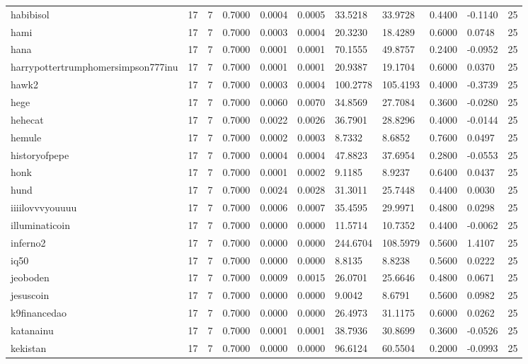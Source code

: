 \begin{table}[htbp]
\begin{tabular}{lllllllllll}
habibisol & 17 & 7 & 0.7000 & 0.0004 & 0.0005 & 33.5218 & 33.9728 & 0.4400 & -0.1140 & 25 \\
hami & 17 & 7 & 0.7000 & 0.0003 & 0.0004 & 20.3230 & 18.4289 & 0.6000 & 0.0748 & 25 \\
hana & 17 & 7 & 0.7000 & 0.0001 & 0.0001 & 70.1555 & 49.8757 & 0.2400 & -0.0952 & 25 \\
harrypottertrumphomersimpson777inu & 17 & 7 & 0.7000 & 0.0001 & 0.0001 & 20.9387 & 19.1704 & 0.6000 & 0.0370 & 25 \\
hawk2 & 17 & 7 & 0.7000 & 0.0003 & 0.0004 & 100.2778 & 105.4193 & 0.4000 & -0.3739 & 25 \\
hege & 17 & 7 & 0.7000 & 0.0060 & 0.0070 & 34.8569 & 27.7084 & 0.3600 & -0.0280 & 25 \\
hehecat & 17 & 7 & 0.7000 & 0.0022 & 0.0026 & 36.7901 & 28.8296 & 0.4000 & -0.0144 & 25 \\
hemule & 17 & 7 & 0.7000 & 0.0002 & 0.0003 & 8.7332 & 8.6852 & 0.7600 & 0.0497 & 25 \\
historyofpepe & 17 & 7 & 0.7000 & 0.0004 & 0.0004 & 47.8823 & 37.6954 & 0.2800 & -0.0553 & 25 \\
honk & 17 & 7 & 0.7000 & 0.0001 & 0.0002 & 9.1185 & 8.9237 & 0.6400 & 0.0437 & 25 \\
hund & 17 & 7 & 0.7000 & 0.0024 & 0.0028 & 31.3011 & 25.7448 & 0.4400 & 0.0030 & 25 \\
iiiilovvvyouuuu & 17 & 7 & 0.7000 & 0.0006 & 0.0007 & 35.4595 & 29.9971 & 0.4800 & 0.0298 & 25 \\
illuminaticoin & 17 & 7 & 0.7000 & 0.0000 & 0.0000 & 11.5714 & 10.7352 & 0.4400 & -0.0062 & 25 \\
inferno2 & 17 & 7 & 0.7000 & 0.0000 & 0.0000 & 244.6704 & 108.5979 & 0.5600 & 1.4107 & 25 \\
iq50 & 17 & 7 & 0.7000 & 0.0000 & 0.0000 & 8.8135 & 8.8238 & 0.5600 & 0.0222 & 25 \\
jeoboden & 17 & 7 & 0.7000 & 0.0009 & 0.0015 & 26.0701 & 25.6646 & 0.4800 & 0.0671 & 25 \\
jesuscoin & 17 & 7 & 0.7000 & 0.0000 & 0.0000 & 9.0042 & 8.6791 & 0.5600 & 0.0982 & 25 \\
k9financedao & 17 & 7 & 0.7000 & 0.0000 & 0.0000 & 26.4973 & 31.1175 & 0.6000 & 0.0262 & 25 \\
katanainu & 17 & 7 & 0.7000 & 0.0001 & 0.0001 & 38.7936 & 30.8699 & 0.3600 & -0.0526 & 25 \\
kekistan & 17 & 7 & 0.7000 & 0.0000 & 0.0000 & 96.6124 & 60.5504 & 0.2000 & -0.0993 & 25 \\

\end{tabular}
\end{table}
